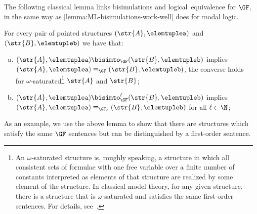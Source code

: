 The following classical lemma links bisimulations and logical~equivalence for $\GF$, in the same way as \cref{lemma:ML-bisimulations-work-well} does for modal logic.
\begin{lemma}\label{lemma:GF-bisimulations-work-well}
For every pair of pointed structures $(\str{A}, \elemtuplea)$ and~$(\str{B}, \elemtupleb)$ we have that:
\begin{enumerate}[(a)]
\item $(\str{A}, \elemtuplea) \bisimto_{\GF} (\str{B}, \elemtupleb)$ implies $(\str{A}, \elemtuplea) \equiv_{\GF} (\str{B}, \elemtupleb)$, the converse holds for $\omega$-saturated\footnote{An $\omega$-saturated structure is, roughly speaking, a structure in which all consistent sets of formulae with one free variable over a finite number of constants interpreted as elements of that structure are realized by some element of the structure. In classical model theory, for any given structure, there is a structure that is $\omega$-saturated and satisfies the same first-order sentences. For details, see~\cite[Chapter 28]{monk1976}.} $\str{A}$ and $\str{B}$;
\item $(\str{A}, \elemtuplea) \bisimto_{\GF}^{\ell} (\str{B}, \elemtupleb)$ implies $(\str{A}, \elemtuplea) \equiv_{\GF_\ell} (\str{B}, \elemtupleb)$ for all $\ell \in \N$;
\end{enumerate}
\end{lemma}
As an example, we use the above lemma to show that there are structures which satisfy the same $\GF$ sentences but can be distinguished by a first-order sentence.
